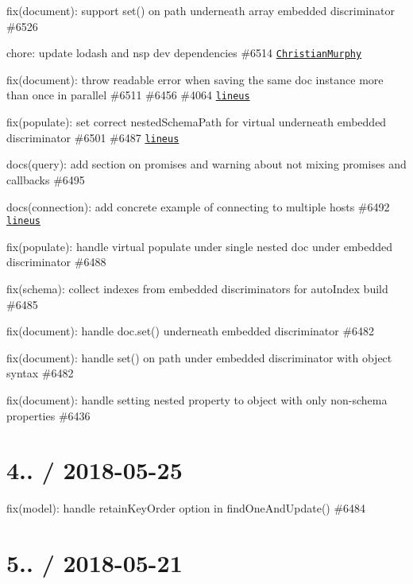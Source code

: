 \begin{DoxyItemize}
\item fix(document)\+: support set() on path underneath array embedded discriminator \#6526
\item chore\+: update lodash and nsp dev dependencies \#6514 \href{https://github.com/ChristianMurphy}{\tt Christian\+Murphy}
\item fix(document)\+: throw readable error when saving the same doc instance more than once in parallel \#6511 \#6456 \#4064 \href{https://github.com/lineus}{\tt lineus}
\item fix(populate)\+: set correct nested\+Schema\+Path for virtual underneath embedded discriminator \#6501 \#6487 \href{https://github.com/lineus}{\tt lineus}
\item docs(query)\+: add section on promises and warning about not mixing promises and callbacks \#6495
\item docs(connection)\+: add concrete example of connecting to multiple hosts \#6492 \href{https://github.com/lineus}{\tt lineus}
\item fix(populate)\+: handle virtual populate under single nested doc under embedded discriminator \#6488
\item fix(schema)\+: collect indexes from embedded discriminators for auto\+Index build \#6485
\item fix(document)\+: handle {\ttfamily doc.\+set()} underneath embedded discriminator \#6482
\item fix(document)\+: handle set() on path under embedded discriminator with object syntax \#6482
\item fix(document)\+: handle setting nested property to object with only non-\/schema properties \#6436
\end{DoxyItemize}

\section*{4.. / 2018-\/05-\/25 }


\begin{DoxyItemize}
\item fix(model)\+: handle retain\+Key\+Order option in find\+One\+And\+Update() \#6484
\end{DoxyItemize}

\section*{5.. / 2018-\/05-\/21 }


